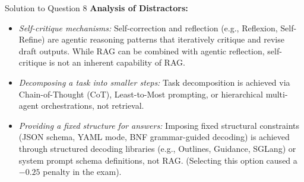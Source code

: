 \documentclass[11pt,a4paper]{article}
\begin{document}
\begin{solutionbox}{Solution to Question 8}
\medskip
\textbf{Analysis of Distractors:}
\begin{itemize}[leftmargin=1.5cm]
    \item[\textbf{(a)}] \textit{Self-critique mechanisms:} Self-correction and reflection (e.g., Reflexion, Self-Refine) are agentic reasoning patterns that iteratively critique and revise draft outputs. While RAG can be combined with agentic reflection, self-critique is not an inherent capability of RAG.
    \item[\textbf{(b)}] \textit{Decomposing a task into smaller steps:} Task decomposition is achieved via Chain-of-Thought (CoT), Least-to-Most prompting, or hierarchical multi-agent orchestrations, not retrieval.
    \item[\textbf{(e)}] \textit{Providing a fixed structure for answers:} Imposing fixed structural constraints (JSON schema, YAML mode, BNF grammar-guided decoding) is achieved through structured decoding libraries (e.g., Outlines, Guidance, SGLang) or system prompt schema definitions, not RAG. (Selecting this option caused a $-0.25$ penalty in the exam).
\end{itemize}
\end{solutionbox}

\bigskip
\end{document}
